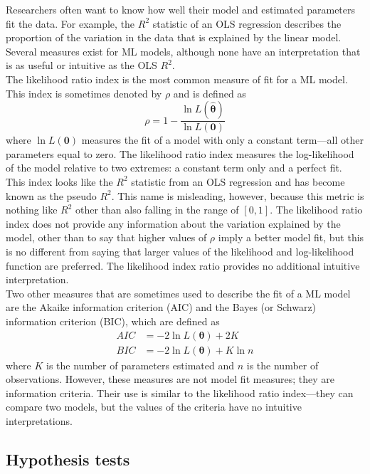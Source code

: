 \documentclass[11pt,letterpaper]{article}
\begin{document}
Researchers often want to know how well their model and estimated parameters fit the data. For example, the $R^2$ statistic of an OLS regression describes the proportion of the variation in the data that is explained by the linear model. Several measures exist for ML models, although none have an interpretation that is as useful or intuitive as the OLS $R^2$. \\

\noindent The likelihood ratio index is the most common measure of fit for a ML model. This index is sometimes denoted by $\rho$ and is defined as
$$\rho = 1 - \frac{\ln L(\widehat{\bm{\theta}})}{\ln L(\bm{0})}$$
where $\ln L(\bm{0})$ measures the fit of a model with only a constant term---all other parameters equal to zero. The likelihood ratio index measures the log-likelihood of the model relative to two extremes: a constant term only and a perfect fit. This index looks like the $R^2$ statistic from an OLS regression and has become known as the pseudo $R^2$. This name is misleading, however, because this metric is nothing like $R^2$ other than also falling in the range of $[0, 1]$. The likelihood ratio index does not provide any information about the variation explained by the model, other than to say that higher values of $\rho$ imply a better model fit, but this is no different from saying that larger values of the likelihood and log-likelihood function are preferred. The likelihood index ratio provides no additional intuitive interpretation. \\

\noindent Two other measures that are sometimes used to describe the fit of a ML model are the Akaike information criterion (AIC) and the Bayes (or Schwarz) information criterion (BIC), which are defined as
\begin{align*}
  AIC & = -2 \ln L(\bm{\theta}) + 2 K \\
  BIC & = -2 \ln L(\bm{\theta}) + K \ln n
\end{align*}
where $K$ is the number of parameters estimated and $n$ is the number of observations. However, these measures are not model fit measures; they are information criteria. Their use is similar to the likelihood ratio index---they can compare two models, but the values of the criteria have no intuitive interpretations.

\subsection{Hypothesis tests}
\end{document}
